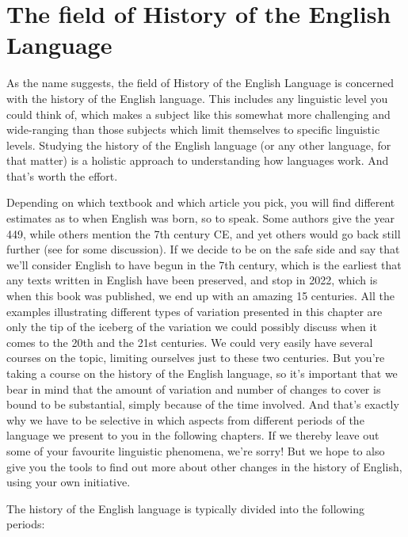 \section{The field of History of the English Language}\label{field-HEL}
As the name suggests, the field of History of the English Language is concerned with the history of the English language. This includes any linguistic level you could think of, which makes a subject like this somewhat more challenging and wide-ranging than those subjects which limit themselves to specific linguistic levels. Studying the history of the English language (or any other language, for that matter) is a holistic approach to understanding how languages work. And that's worth the effort.

Depending on which textbook and which article you pick, you will find different estimates as to when English was born, so to speak. Some authors give the year 449, while others mention the 7th century CE, and yet others would go back still further (see  for some discussion). If we decide to be on the safe side and say that we'll consider English to have begun in the 7th century, which is the earliest that any texts written in English have been preserved, and stop in 2022, which is when this book was published, we end up with an amazing 15 centuries. All the examples illustrating different types of variation presented in this chapter are only the tip of the iceberg of the variation we could possibly discuss when it comes to the 20th and the 21st centuries. We could very easily have several courses on the topic, limiting ourselves just to these two centuries. But you're taking a course on the history of the English language, so it's important that we bear in mind that the amount of variation and number of changes to cover is bound to be substantial, simply because of the time involved. And that's exactly why we have to be selective in which aspects from different periods of the language we present to you in the following chapters. If we thereby leave out some of your favourite linguistic phenomena, we're sorry! But we hope to also give you the tools to find out more about other changes in the history of English, using your own initiative.

The history of the English language is typically divided into the following periods:

